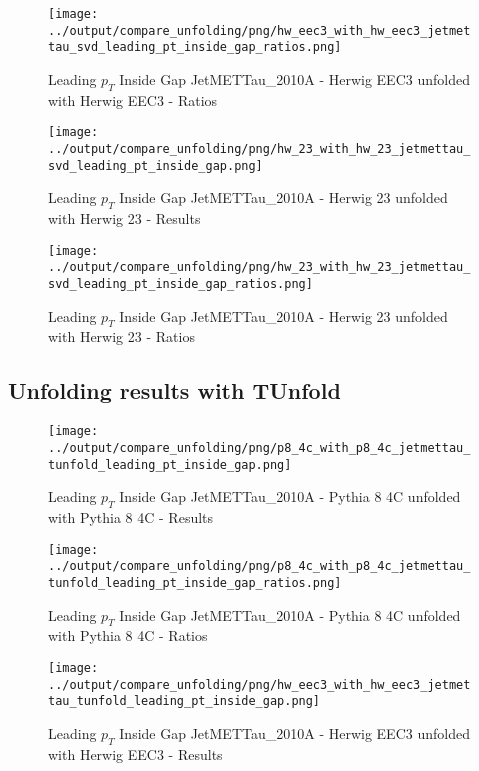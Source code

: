 \documentclass[11pt]{book}
\begin{document}
\begin{figure}[ht]
\centering
\texttt{[image: ../output/compare\_unfolding/png/hw\_eec3\_with\_hw\_eec3\_jetmettau\_svd\_leading\_pt\_inside\_gap\_ratios.png]}
\caption{Leading $p_{T}$ Inside Gap JetMETTau\_2010A - Herwig EEC3 unfolded with Herwig EEC3 - Ratios}
\label{hw_eec3_hw_eec3_jetmettau_svd_leading_pt_inside_gap_b}
\end{figure}

\begin{figure}[ht]
\centering
\texttt{[image: ../output/compare\_unfolding/png/hw\_23\_with\_hw\_23\_jetmettau\_svd\_leading\_pt\_inside\_gap.png]}
\caption{Leading $p_{T}$ Inside Gap JetMETTau\_2010A - Herwig 23 unfolded with Herwig 23 - Results}
\label{hw_23_hw_23_jetmettau_svd_leading_pt_inside_gap_a}
\end{figure}

\begin{figure}[ht]
\centering
\texttt{[image: ../output/compare\_unfolding/png/hw\_23\_with\_hw\_23\_jetmettau\_svd\_leading\_pt\_inside\_gap\_ratios.png]}
\caption{Leading $p_{T}$ Inside Gap JetMETTau\_2010A - Herwig 23 unfolded with Herwig 23 - Ratios}
\label{hw_23_hw_23_jetmettau_svd_leading_pt_inside_gap_b}
\end{figure}


\clearpage
\subsection{Unfolding results with TUnfold}

\begin{figure}[ht]
\centering
\texttt{[image: ../output/compare\_unfolding/png/p8\_4c\_with\_p8\_4c\_jetmettau\_tunfold\_leading\_pt\_inside\_gap.png]}
\caption{Leading $p_{T}$ Inside Gap JetMETTau\_2010A - Pythia 8 4C unfolded with Pythia 8 4C - Results}
\label{p8_p8_jetmettau_tunfold_leading_pt_inside_gap_a}
\end{figure}

\begin{figure}[ht]
\centering
\texttt{[image: ../output/compare\_unfolding/png/p8\_4c\_with\_p8\_4c\_jetmettau\_tunfold\_leading\_pt\_inside\_gap\_ratios.png]}
\caption{Leading $p_{T}$ Inside Gap JetMETTau\_2010A - Pythia 8 4C unfolded with Pythia 8 4C - Ratios}
\label{p8_p8_jetmettau_tunfold_leading_pt_inside_gap_b}
\end{figure}

\begin{figure}[ht]
\centering
\texttt{[image: ../output/compare\_unfolding/png/hw\_eec3\_with\_hw\_eec3\_jetmettau\_tunfold\_leading\_pt\_inside\_gap.png]}
\caption{Leading $p_{T}$ Inside Gap JetMETTau\_2010A - Herwig EEC3 unfolded with Herwig EEC3 - Results}
\label{hw_eec3_hw_eec3_jetmettau_tunfold_leading_pt_inside_gap_a}
\end{figure}
\end{document}
